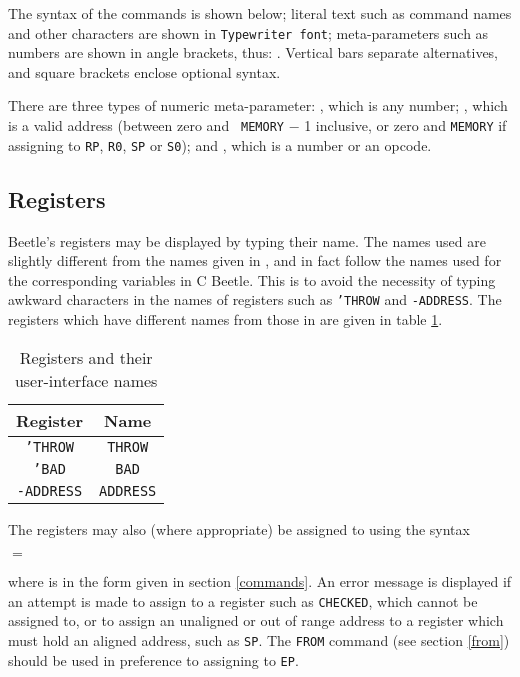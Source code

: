 The syntax of the commands is shown below; literal text such as command names
and other characters are shown in {\tt Typewriter font}; meta-parameters such
as numbers are shown in angle brackets, thus: . Vertical bars
separate alternatives, and square brackets enclose optional syntax.

There are three types of numeric meta-parameter: , which is any
number; , which is a valid address (between zero and {\tt
MEMORY} $-$ 1 inclusive, or zero and {\tt MEMORY} if assigning to {\tt RP},
{\tt R0}, {\tt SP} or {\tt S0}); and , which is a number or an
opcode.

\subsection{Registers}

Beetle's registers may be displayed by typing their name. The names used are
slightly different from the names given in \cite{beetledis}, and in fact follow
the names used for the corresponding variables in C Beetle. This is to avoid
the necessity of typing awkward characters in the names of registers such as
{\tt 'THROW} and {\tt -ADDRESS}. The registers which have different names
from those in \cite{beetledis} are given in table \ref{uregtable}.

\begin{table}[htbp]
\begin{center}
\begin{tabular}{|c|c|} \hline
\rule[-2mm]{0mm}{6mm}\bf Register & \bf Name \\ \hline
{\tt 'THROW} & {\tt THROW} \\
{\tt 'BAD} & {\tt BAD} \\
{\tt -ADDRESS} & {\tt ADDRESS} \\ \hline
\end{tabular}
\caption{\label{uregtable}Registers and their user-interface names}
\end{center}
\end{table}

The registers may also (where appropriate) be assigned to using the syntax

\begin{center} $=$ \end{center}

where  is in the form given in section \ref{commands}. An error
message is displayed if an attempt is made to assign to a register such as
{\tt CHECKED}, which cannot be assigned to, or to assign an unaligned or out
of range address to a register which must hold an aligned address, such as
{\tt SP}. The {\tt FROM} command (see section \ref{from}) should be used in
preference to assigning to {\tt EP}.

